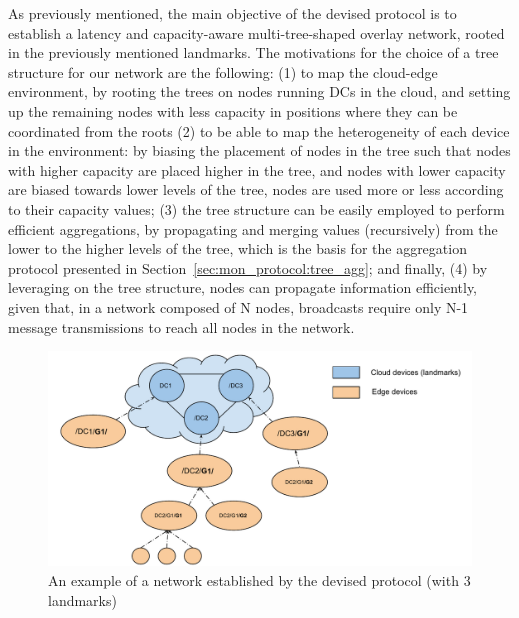 As previously mentioned, the main objective of the devised protocol is to establish a latency and capacity-aware multi-tree-shaped overlay network, rooted in the previously mentioned landmarks. The motivations for the choice of a tree structure for our network are the following: (1) to map the cloud-edge environment, by rooting the trees on nodes running DCs in the cloud, and setting up the remaining nodes with less capacity in positions where they can be coordinated from the roots (2) to be able to map the heterogeneity of each device in the environment: by biasing the placement of nodes in the tree such that nodes with higher capacity are placed higher in the tree, and nodes with lower capacity are biased towards lower levels of the tree, nodes are used more or less according to their capacity values; (3) the tree structure can be easily employed to perform efficient aggregations, by propagating and merging values (recursively) from the lower to the higher levels of the tree, which is the basis for the aggregation protocol presented in Section~\ref{sec:mon_protocol:tree_agg}; and finally, (4) by leveraging on the tree structure, nodes can propagate information efficiently, given that, in a network composed of N nodes, broadcasts require only N-1 message transmissions to reach all nodes in the network. 

\begin{figure}[htbp]
    \centering
    \includegraphics[width=\textwidth]{Chapters/membership/images/DeMMon-overlay-structure.pdf}
    \caption{An example of a network established by the devised protocol (with 3 landmarks)}
    \label{fig:demmon-membership-structure}
\end{figure}

